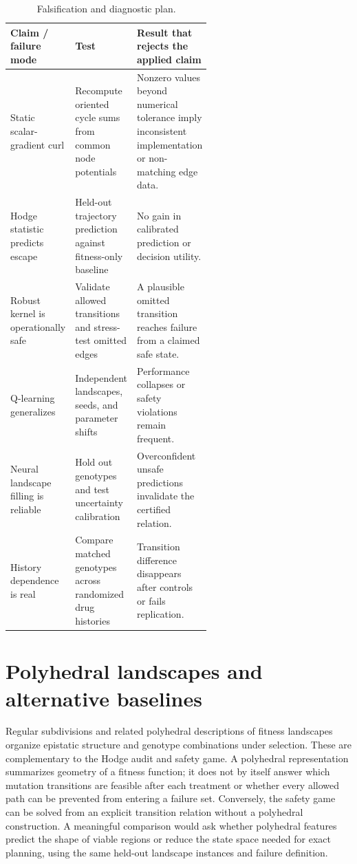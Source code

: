 \documentclass[11pt]{article}
\theoremstyle{definition}\newtheorem{definition}[proposition]{Definition}\theoremstyle{remark}\newtheorem{remark}[proposition]{Remark}
\begin{document}
\begin{table}[htbp]\centering\small\caption{Falsification and diagnostic plan.}\label{tab:falsify}\begin{tabularx}{\linewidth}{p{0.27\linewidth}p{0.31\linewidth}X}\toprule Claim / failure mode & Test & Result that rejects the applied claim\\\midrule Static scalar-gradient curl & Recompute oriented cycle sums from common node potentials & Nonzero values beyond numerical tolerance imply inconsistent implementation or non-matching edge data.\\ Hodge statistic predicts escape & Held-out trajectory prediction against fitness-only baseline & No gain in calibrated prediction or decision utility.\\ Robust kernel is operationally safe & Validate allowed transitions and stress-test omitted edges & A plausible omitted transition reaches failure from a claimed safe state.\\ Q-learning generalizes & Independent landscapes, seeds, and parameter shifts & Performance collapses or safety violations remain frequent.\\ Neural landscape filling is reliable & Hold out genotypes and test uncertainty calibration & Overconfident unsafe predictions invalidate the certified relation.\\ History dependence is real & Compare matched genotypes across randomized drug histories & Transition difference disappears after controls or fails replication.\\\bottomrule\end{tabularx}\end{table}

\section{Polyhedral landscapes and alternative baselines}
Regular subdivisions and related polyhedral descriptions of fitness landscapes organize epistatic structure and genotype combinations under selection. These are complementary to the Hodge audit and safety game. A polyhedral representation summarizes geometry of a fitness function; it does not by itself answer which mutation transitions are feasible after each treatment or whether every allowed path can be prevented from entering a failure set. Conversely, the safety game can be solved from an explicit transition relation without a polyhedral construction. A meaningful comparison would ask whether polyhedral features predict the shape of viable regions or reduce the state space needed for exact planning, using the same held-out landscape instances and failure definition.
\end{document}
